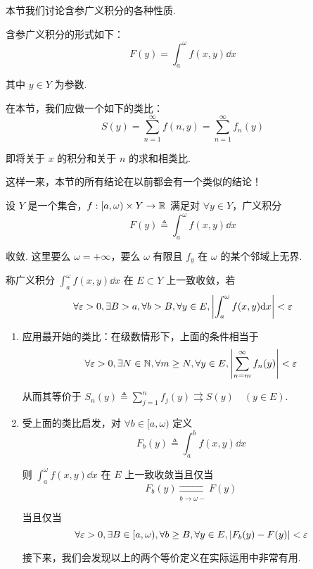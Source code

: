 本节我们讨论含参广义积分的各种性质.

含参广义积分的形式如下：
$$
F(y)=\int_a^\omega f(x,y)\dd x
$$

其中 $y\in Y$ 为参数.

在本节，我们应做一个如下的类比：
$$
S(y)=\sum_{n=1}^\infty f(n,y)=\sum_{n=1}^\infty f_n(y)
$$

即将关于 $x$ 的积分和关于 $n$ 的求和相类比.

这样一来，本节的所有结论在以前都会有一个类似的结论！



设 $Y$ 是一个集合，$f:[a,\omega)\times Y\to\mathbb{R}$ 满足对 $\forall y\in Y$，广义积分
$$
F(y)\triangleq\int_a^\omega f(x,y)\dd x
$$

收敛. 这里要么 $\omega=+\infty$，要么 $\omega$ 有限且 $f_y$ 在 $\omega$ 的某个邻域上无界.

\begin{definition}
    称广义积分 $\displaystyle\int_a^\omega f(x,y)\dd x$ 在 $E\subset Y$ 上一致收敛，若
$$
\forall\varepsilon>0,\exists B>a,\forall b>B,\forall y\in E,\left\lvert{\int_a^\omega f(x,y)\mathrm{d}x}\right\rvert<\varepsilon
$$
\end{definition}

\begin{hint}
    \begin{enumerate}
        \item 应用最开始的类比：在级数情形下，上面的条件相当于
$$
\forall\varepsilon>0,\exists N\in\mathbb{N},\forall m\ge N,\forall y\in E,\left\lvert{\sum_{n=m}^\infty f_n(y)}\right\rvert<\varepsilon
$$

        从而其等价于 $S_n(y)\triangleq\displaystyle\sum_{j=1}^nf_j(y)\rightrightarrows S(y)\quad(y\in E)$.

        \item 受上面的类比启发，对 $\forall b\in[a,\omega)$ 定义
$$
F_b(y)\triangleq\int_a^bf(x,y)\dd x
$$

        则 $\displaystyle\int_a^\omega f(x,y)\dd x$ 在 $E$ 上一致收敛当且仅当
$$
F_b(y)\underset{b\to\omega-}{\rightrightarrows}F(y)
$$

        当且仅当
$$
\forall\varepsilon>0,\exists B\in[a,\omega),\forall b\ge B,\forall y\in E,\left\lvert{F_b(y)-F(y)}\right\rvert<\varepsilon
$$

        接下来，我们会发现以上的两个等价定义在实际运用中非常有用.
    \end{enumerate}
\end{hint}

